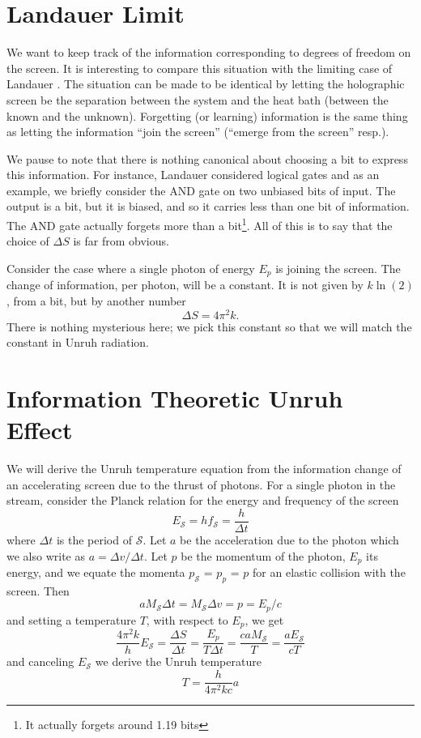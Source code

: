 \documentclass[12pt,a4paper]{article}
\begin{document}
\section{Landauer Limit}
We want to keep track of the information corresponding to degrees of freedom on the screen. It is interesting to compare this situation with the limiting case of Landauer \cite{landauer}.  The situation can be made to be identical by letting the holographic screen be the separation between the system and the heat bath (between the known and the unknown).  Forgetting (or learning) information is the same thing as letting the information ``join the screen'' (``emerge from the screen'' resp.).

We pause to note that there is nothing canonical about choosing a bit to express this information.  For instance, Landauer considered logical gates and as an example, we briefly consider the AND gate on two unbiased bits of input.  The output is a bit, but it is biased, and so it carries less than one bit of information.  The AND gate actually forgets more than a bit\footnote{It actually forgets around 1.19 bits}.  All of this is to say that the choice of $\Delta S$ is far from obvious.

Consider the case where a single photon of energy $E_p$ is joining the screen.  The change of information, per photon, will be a constant.  It is not given by $k\ln(2)$, from a bit, but by another number
\[
  \Delta S = 4 \pi ^ 2 k.
\]
There is nothing mysterious here; we pick this constant so that we will match the constant in Unruh radiation.

\section{Information Theoretic Unruh Effect}

We will derive the Unruh temperature equation from the information change of an accelerating screen due to the thrust of photons. For a single photon in the stream, consider the Planck relation for the energy and frequency of the screen
\[
  E_\mathscr{S} = h f_\mathscr{S} = \frac{h}{\Delta t}
\]
where $\Delta t$ is the period of $\mathscr{S}$. Let $a$ be the acceleration due to the photon which we also write as $a = \Delta v / \Delta t$.  Let $p$ be the momentum of the photon, $E_p$ its energy, and we equate the momenta $p_\mathscr{S}$ = $p_p$ = $p$ for an elastic collision with the screen.  Then
\[
  a M_\mathscr{S} \Delta t = M_\mathscr{S}  \Delta v = p = E_p / c
  \]
and setting a temperature $T$, with respect to $E_p$, we get
\[
  \frac{4 \pi^2 k}{h} E_\mathscr{S} = \frac{\Delta S}{\Delta t} = \frac{E_p}{T \Delta t} = \frac{ca M_\mathscr{S}}{T} = \frac{aE_\mathscr{S}}{cT}
\]
and canceling $E_\mathscr{S}$ we derive the Unruh temperature \cite{unruh}
\[
T = \frac{h}{4\pi^2k c} a
\]
\end{document}
